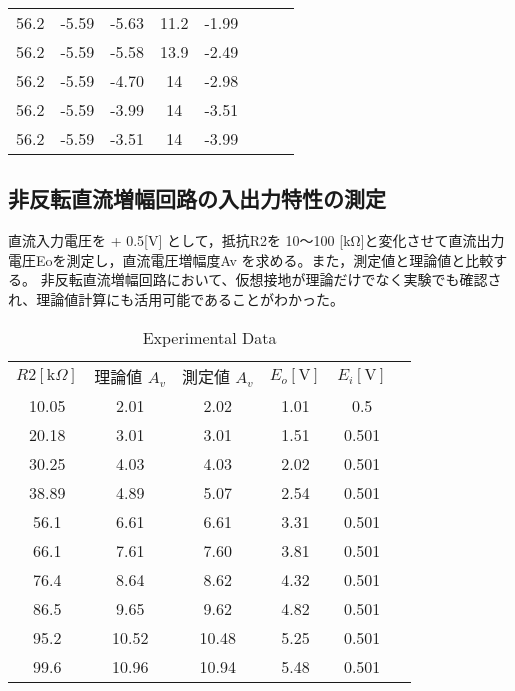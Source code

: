 \documentclass[a4paper,11pt,xelatex,ja=standard]{bxjsarticle}
\begin{document}
\begin{table}[htbp]
\begin{tabular}{@{}cccccccc@{}}
                  56.2 & -5.59 & -5.63 & 11.2  & -1.99  &                     &                     \\
                  56.2 & -5.59 & -5.58 & 13.9  & -2.49  &                     &                     \\
                  56.2 & -5.59 & -4.70 & 14    & -2.98  &                     &                     \\
                  56.2 & -5.59 & -3.99 & 14    & -3.51  &                     &                     \\
                  56.2 & -5.59 & -3.51 & 14    & -3.99  &                     &                     \\ 
                \end{tabular}
              \end{table}

    
    \subsection{非反転直流増幅回路の入出力特性の測定}
    直流入力電圧を + 0.5[V] として，抵抗R2を 10～100 [kΩ]と変化させて直流出力電圧Eoを測定し，直流電圧増幅度Av を求める。また，測定値と理論値と比較する。  
    非反転直流増幅回路において、仮想接地が理論だけでなく実験でも確認され、理論値計算にも活用可能であることがわかった。

    \begin{table}[htbp]
        \centering
        \caption{Experimental Data}
        \label{tab:data}
        \begin{tabular}{cccccc}
        $R2 [\mathrm{k}\Omega]$ & 理論値 $A_v$ & 測定値 $A_v$ & $E_o [\mathrm{V}]$ & $E_i [\mathrm{V}]$ \\
        10.05 & 2.01 & 2.02 & 1.01 & 0.5 \\
        20.18 & 3.01 & 3.01 & 1.51 & 0.501 \\
        30.25 & 4.03 & 4.03 & 2.02 & 0.501 \\
        38.89 & 4.89 & 5.07 & 2.54 & 0.501 \\
        56.1 & 6.61 & 6.61 & 3.31 & 0.501 \\
        66.1 & 7.61 & 7.60 & 3.81 & 0.501 \\
        76.4 & 8.64 & 8.62 & 4.32 & 0.501 \\
        86.5 & 9.65 & 9.62 & 4.82 & 0.501 \\
        95.2 & 10.52 & 10.48 & 5.25 & 0.501 \\
        99.6 & 10.96 & 10.94 & 5.48 & 0.501 \\
            \end{tabular}
    \end{table}
\end{document}

